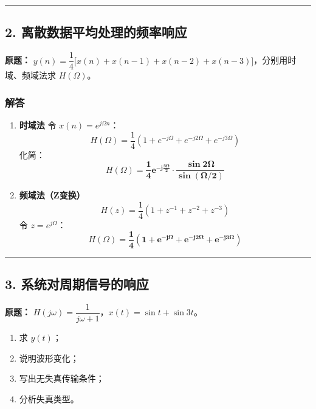 \vspace{1em}
\hrule
\vspace{1em}

\subsection{2. 离散数据平均处理的频率响应}
\noindent\textbf{原题：}
$y(n)=\dfrac14\big[x(n)+x(n-1)+x(n-2)+x(n-3)\big]$，分别用时域、频域法求 $H(\Omega)$。

\subsubsection{解答}
\begin{enumerate}[label=(\arabic*)]
    \item \textbf{时域法}
    令 $x(n)=e^{j\Omega n}$：
    \[
    H(\Omega) = \frac14\left(1+e^{-j\Omega}+e^{-j2\Omega}+e^{-j3\Omega}\right)
    \]
    化简：
    \[
    H(\Omega) = \boldsymbol{\frac14 e^{-j\frac{3\Omega}{2}} \cdot \frac{\sin2\Omega}{\sin(\Omega/2)}}
    \]

    \item \textbf{频域法（Z变换）}
    \[
    H(z) = \frac14\left(1+z^{-1}+z^{-2}+z^{-3}\right)
    \]
    令 $z=e^{j\Omega}$：
    \[
    H(\Omega) = \boldsymbol{\frac14\left(1+e^{-j\Omega}+e^{-j2\Omega}+e^{-j3\Omega}\right)}
    \]
\end{enumerate}

\vspace{1em}
\hrule
\vspace{1em}

\subsection{3. 系统对周期信号的响应}
\noindent\textbf{原题：}
$H(j\omega)=\dfrac{1}{j\omega+1}$，$x(t)=\sin t+\sin3t$。
\begin{enumerate}[label=(\arabic*)]
    \item 求 $y(t)$；
    \item 说明波形变化；
    \item 写出无失真传输条件；
    \item 分析失真类型。
\end{enumerate}

